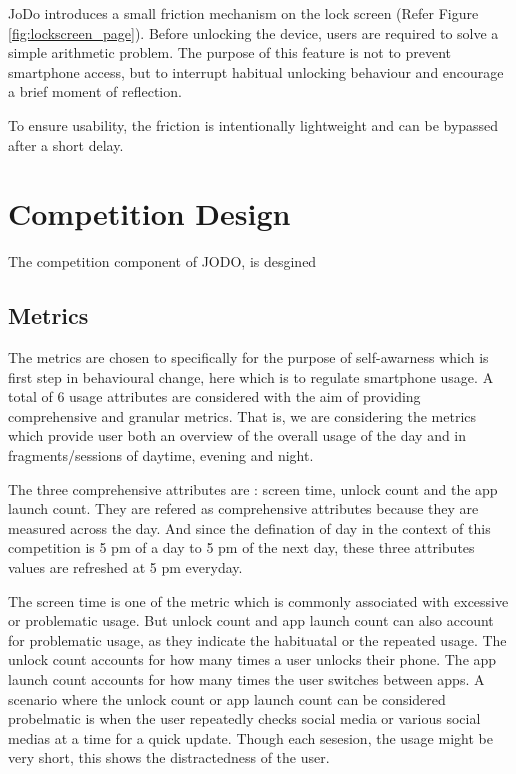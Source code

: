 \documentclass[11pt]{report}
\begin{document}
JoDo introduces a small friction mechanism on the lock screen (Refer Figure \ref{fig:lockscreen_page}). Before unlocking the 
device, users are required to solve a simple arithmetic problem. The purpose of this 
feature is not to prevent smartphone access, but to interrupt habitual unlocking behaviour 
and encourage a brief moment of reflection.

To ensure usability, the friction is intentionally lightweight and can be bypassed after 
a short delay.

\section{Competition Design}

The competition component of JODO, is desgined 

\subsection{Metrics}
The metrics are chosen to specifically for the purpose of self-awarness which is first step in behavioural change, here which is to regulate smartphone usage.
A total of 6 usage attributes are considered with the aim of providing comprehensive and granular metrics. That is, we are considering the metrics which provide user both an overview of the overall usage of the day and in fragments/sessions of daytime, evening and night.

The three comprehensive attributes are : screen time, unlock count and the app launch count. They are refered as comprehensive attributes because they are measured across the day. 
And since the defination of day in the context of this competition is 5 pm of a day to 5 pm of the next day, these three attributes values are refreshed at 5 pm everyday.

The screen time is one of the metric which is commonly associated with excessive or problematic usage. But unlock count and app launch count can also account for problematic usage, as they indicate the habituatal or the repeated usage. 
The unlock count accounts for how many times a user unlocks their phone. The app launch count accounts for how many times the user switches between apps.
A scenario where the unlock count or app launch count can be considered probelmatic is when the user repeatedly checks social media or various social medias at a time for a quick update. 
Though each sesesion, the usage might be very short, this shows the distractedness of the user.
\end{document}
